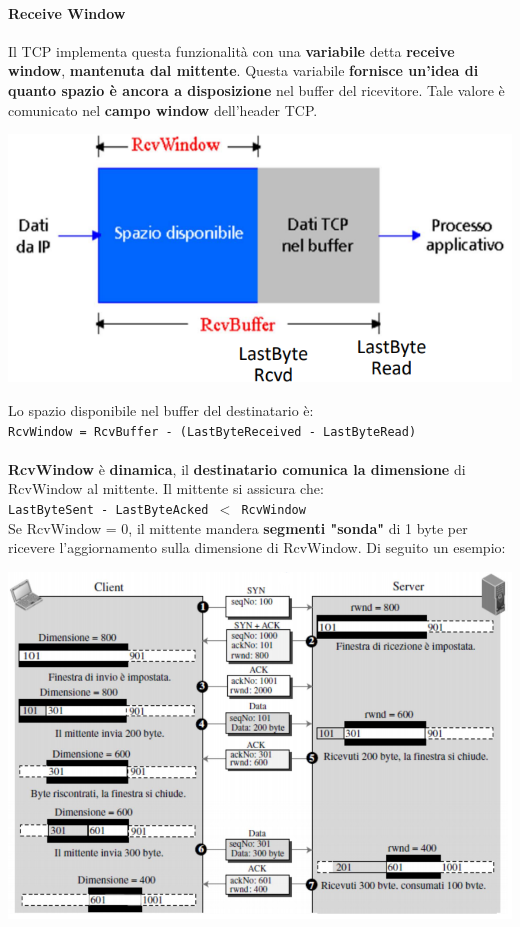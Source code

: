 \documentclass[10pt]{article}
\begin{document}
\paragraph{Receive Window} Il TCP implementa questa funzionalità con una \textbf{variabile} detta \textbf{receive window}, \textbf{mantenuta dal mittente}. Questa variabile \textbf{fornisce un'idea di quanto spazio è ancora a disposizione} nel buffer del ricevitore. Tale valore è comunicato nel \textbf{campo window} dell'header TCP.
\begin{center}
\includegraphics[scale=0.7]{tcprecwindow.png}
\end{center}
Lo spazio disponibile nel buffer del destinatario è:\\
\texttt{RcvWindow = RcvBuffer - (LastByteReceived - LastByteRead)}\\\\
\textbf{RcvWindow} è \textbf{dinamica}, il \textbf{destinatario comunica la dimensione} di RcvWindow al mittente. Il mittente si assicura che:\\
\texttt{LastByteSent - LastByteAcked $<$ RcvWindow}\\
Se RcvWindow = 0, il mittente mandera \textbf{segmenti "sonda"} di 1 byte per ricevere l'aggiornamento sulla dimensione di RcvWindow. Di seguito un esempio:
\begin{center}
\includegraphics[scale=0.7]{tcprcvwinesempio.png}
\end{center}
\end{document}
